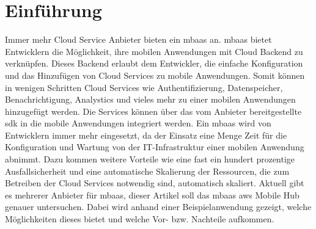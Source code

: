 \section{Einführung}
Immer mehr Cloud Service Anbieter bieten ein \gls{mbaas} an. \gls{mbaas} bietet Entwicklern die Möglichkeit, ihre mobilen Anwendungen mit Cloud Backend zu verknüpfen. Dieses Backend erlaubt dem Entwickler, die einfache Konfiguration und das Hinzufügen von Cloud Services zu mobile Anwendungen. Somit können in wenigen Schritten Cloud Services wie Authentifizierung, Datenspeicher, Benachrichtigung, Analystics und vieles mehr zu einer mobilen Anwendungen hinzugefügt werden. Die Services können über das vom Anbieter bereitgestellte \gls{sdk} in die mobile Anwendungen integriert werden. Ein \gls{mbaas} wird von Entwicklern immer mehr eingesetzt, da der Einsatz eine Menge Zeit für die Konfiguration und Wartung von der IT-Infrastruktur einer mobilen Anwendung abnimmt. Dazu kommen weitere Vorteile wie eine fast ein hundert prozentige Ausfallsicherheit und eine automatische Skalierung der Ressourcen, die zum Betreiben der Cloud Services notwendig sind, automatisch skaliert. Aktuell gibt es mehrerer Anbieter für \gls{mbaas}, dieser Artikel soll das \gls{mbaas} \gls{aws} Mobile Hub genauer untersuchen. Dabei wird anhand einer Beispielanwendung gezeigt, welche Möglichkeiten dieses bietet und welche Vor- bzw. Nachteile aufkommen. 

